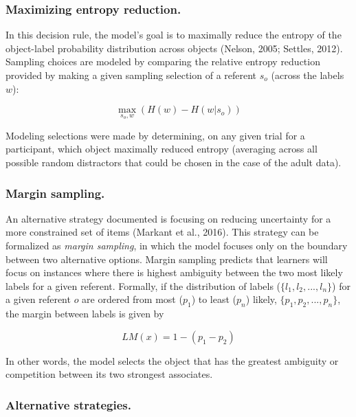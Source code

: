 \documentclass[10pt, letterpaper]{article}
\begin{document}
\subsubsection{Maximizing entropy
reduction.}\label{maximizing-entropy-reduction.}

In this decision rule, the model's goal is to maximally reduce the
entropy of the object-label probability distribution across objects
(Nelson, 2005; Settles, 2012). Sampling choices are modeled by comparing
the relative entropy reduction provided by making a given sampling
selection of a referent \(s_o\) (across the labels \(w\)):

\begin{equation}
\max_{s_o,w}({H(w)-H(w|s_o)})
\label{eq:entropy_reduction}
\end{equation}

Modeling selections were made by determining, on any given trial for a
participant, which object maximally reduced entropy (averaging across
all possible random distractors that could be chosen in the case of the
adult data).

\subsubsection{Margin sampling.}\label{margin-sampling.}

An alternative strategy documented is focusing on reducing uncertainty
for a more constrained set of items (Markant et al., 2016). This
strategy can be formalized as \emph{margin sampling}, in which the model
focuses only on the boundary between two alternative options. Margin
sampling predicts that learners will focus on instances where there is
highest ambiguity between the two most likely labels for a given
referent. Formally, if the distribution of labels
(\(\{l_1,l_2,...,l_n\}\)) for a given referent \(o\) are ordered from
most (\(p_1\)) to least (\(p_n\)) likely, \(\{p_1,p_2,...,p_n\}\), the
margin between labels is given by

\begin{equation}
LM(x) = 1 - (p_1 - p_2)
\label{eq:margin_sampling}
\end{equation}

In other words, the model selects the object that has the greatest
ambiguity or competition between its two strongest associates.

\subsubsection{Alternative strategies.}\label{alternative-strategies.}
\end{document}
